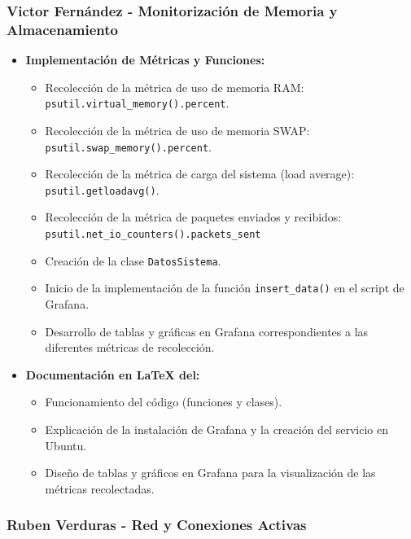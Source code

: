 \documentclass{article}
\begin{document}
\subsubsection{Victor Fernández - Monitorización de Memoria y Almacenamiento}

\begin{itemize}
    \item \textbf{Implementación de Métricas y Funciones:}
    \begin{itemize}
        \item Recolección de la métrica de uso de memoria RAM: \texttt{psutil.virtual\_memory().percent}.
        \item Recolección de la métrica de uso de memoria SWAP: \texttt{psutil.swap\_memory().percent}.
        \item Recolección de la métrica de carga del sistema (load average): \texttt{psutil.getloadavg()}.
        \item Recolección de la métrica de paquetes enviados y recibidos: \texttt{psutil.net\_io\_counters().packets\_sent}
        \item Creación de la clase \texttt{DatosSistema}.
        \item Inicio de la implementación de la función \texttt{insert\_data()} en el script de Grafana.
        \item Desarrollo de tablas y gráficas en Grafana correspondientes a las diferentes métricas de recolección.
    \end{itemize}
    \item \textbf{Documentación en \LaTeX{} del:}
    \begin{itemize}
        \item Funcionamiento del código (funciones y clases).
        \item Explicación de la instalación de Grafana y la creación del servicio en Ubuntu.
        \item Diseño de tablas y gráficos en Grafana para la visualización de las métricas recolectadas.
    \end{itemize}
\end{itemize}

\subsubsection{Ruben Verduras - Red y Conexiones Activas}
\end{document}
